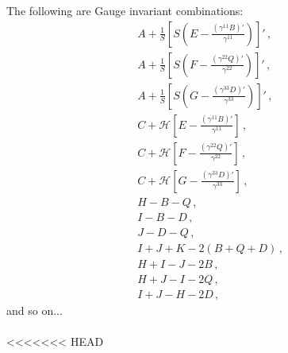 \documentclass{article}
\newcommand*\scr[1]{\mathscr{#1}}
\newcommand*\p[1]{\left(#1\right)}
\newcommand*\ps[1]{\left[#1\right]}
\newcommand*\f[2]{\frac{#1}{#2}}
\begin{document}
The following are Gauge invariant combinations:
\begin{align}
&A+\f1S\ps{S\p{E-\f{(\gamma^{11} B)'}{\gamma^{11}}}}'\,,\\
&A+\f1S\ps{S\p{F-\f{(\gamma^{22} Q)'}{\gamma^{22}}}}'\,,\\
&A+\f1S\ps{S\p{G-\f{(\gamma^{33} D)'}{\gamma^{33}}}}'\,,\\
&C+\scr H\ps{E-\f{(\gamma^{11}B)'}{\gamma^{11}}}\,,\\
&C+\scr H\ps{F-\f{(\gamma^{22}Q)'}{\gamma^{22}}}\,,\\
&C+\scr H\ps{G-\f{(\gamma^{33}D)'}{\gamma^{33}}}\,,\\
&H-B-Q\,,\\
&I-B-D\,,\\
&J-D-Q\,,\\
&I+J+K-2(B+Q+D)\,,\\
&H+I-J-2B\,,\\
&H+J-I-2Q\,,\\
&I+J-H-2D\,,
\end{align}
and so on...
\\\\
<<<<<<< HEAD
\end{document}
